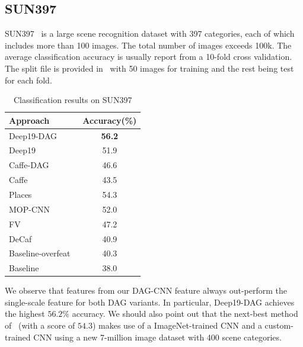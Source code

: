 \documentclass[10pt,twocolumn,letterpaper]{article}
\begin{document}
\subsection{SUN397}

SUN397~\cite{SUN397} is a large scene recognition dataset with 397 categories, each of which includes more than 100 images. The total number of images exceeds 100k. The average classification accuracy is usually report from a 10-fold cross validation. The split file is provided in~\cite{SUN397} with 50 images for training and the rest being test for each fold.  


\begin{table}[htbp]
\begin{center}
\begin{tabular}{|l|c|}
\hline
Approach & Accuracy(\%) \\
\hline
Deep19-DAG & \textbf{56.2} \\
Deep19~\cite{veryDeep} & 51.9 \\
Caffe-DAG & 46.6	\\
Caffe~\cite{Caffe} & 43.5 \\ \hline
Places~\cite{zhoulearning}	& 54.3	\\
MOP-CNN~\cite{Gong14} & 52.0 \\
FV~\cite{FV} & 47.2 \\
DeCaf~\cite{DeCaf} & 40.9	\\
Baseline-overfeat~\cite{SUN_ijcv}	&40.3 \\
Baseline~\cite{SUN397} & 38.0 \\
\hline
\end{tabular}
\end{center}
\caption{Classification results on SUN397}
\label{table:SUN397}
\end{table}

We observe that features from our DAG-CNN feature always out-perform the single-scale feature for both DAG variants. In particular, Deep19-DAG achieves the highest $56.2\%$ accuracy. We should also point out that the next-best method of~\cite{zhoulearning} (with a score of $54.3$) makes use of a ImageNet-trained CNN and a custom-trained CNN using a new 7-million image dataset with 400 scene categories.

\end{document}
